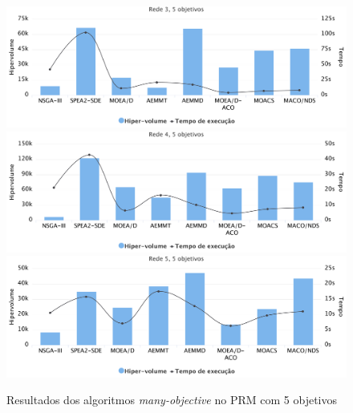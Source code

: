 \begin{figure}[!htbp]	
	\includegraphics[width=1\textwidth]{cap_experimentos/figs/etapa4/r3o5}
	\includegraphics[width=1\textwidth]{cap_experimentos/figs/etapa4/r4o5}
	\includegraphics[width=1\textwidth]{cap_experimentos/figs/etapa4/r5o5}
	\caption{\label{fig_exp4_mrp_o5}Resultados dos algoritmos \textit{many-objective} no PRM com 5 objetivos}
\end{figure}

